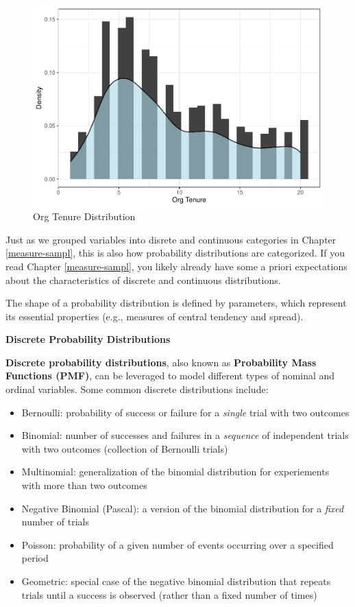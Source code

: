 \documentclass[]{book}
\providecommand{\tightlist}{%
  \setlength{\itemsep}{0pt}\setlength{\parskip}{0pt}}
\begin{document}
\begin{figure}

{\centering \includegraphics{_main_files/figure-latex/org-tenure-dist-1} 

}

\caption{Org Tenure Distribution}\label{fig:org-tenure-dist}
\end{figure}

Just as we grouped variables into disrete and continuous categories in Chapter \ref{measure-sampl}, this is also how probability distributions are categorized. If you read Chapter \ref{measure-sampl}, you likely already have some a priori expectations about the characteristics of discrete and continuous distributions.

The shape of a probability distribution is defined by parameters, which represent its essential properties (e.g., measures of central tendency and spread).

\textbf{Discrete Probability Distributions}

\textbf{Discrete probability distributions}, also known as \textbf{Probability Mass Functions (PMF)}, can be leveraged to model different types of nominal and ordinal variables. Some common discrete distributions include:

\begin{itemize}
\tightlist
\item
  Bernoulli: probability of success or failure for a \emph{single} trial with two outcomes
\item
  Binomial: number of successes and failures in a \emph{sequence} of independent trials with two outcomes (collection of Bernoulli trials)
\item
  Multinomial: generalization of the binomial distribution for experiements with more than two outcomes
\item
  Negative Binomial (Pascal): a version of the binomial distribution for a \emph{fixed} number of trials
\item
  Poisson: probability of a given number of events occurring over a specified period
\item
  Geometric: special case of the negative binomial distribution that repeats trials until a success is observed (rather than a fixed number of times)
\end{itemize}
\end{document}
